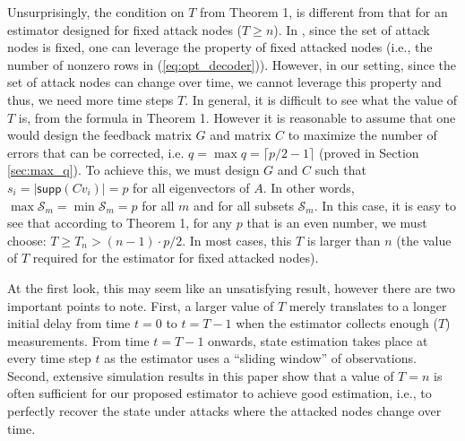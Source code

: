 \documentclass[../../thesis.tex]{subfiles}
\begin{document}
Unsurprisingly, the condition on $T$ from Theorem 1, is different from that for an estimator designed for fixed attack nodes ($T\geq n$). In \cite{Fawzi2014}, since the set of attack nodes is fixed, one can leverage the property of fixed attacked nodes (i.e., the number of nonzero rows in (\ref{eq:opt_decoder})). However, in our setting, since the set of attack nodes can change over time, we cannot leverage this property and thus, we need more time steps $T$.
In general, it is difficult to see what the value of $T$ is, from the formula in Theorem 1. However it is reasonable to assume that one would design the feedback matrix $G$ and matrix $C$ to maximize the number of errors that can be corrected, i.e. $q = \max q = \lceil p/2 - 1 \rceil$ (proved in Section \ref{sec:max_q}). To achieve this, we must design $G$ and $C$ such that $s_i = \lvert \textsf{supp} (C v_i) \rvert = p$ for all eigenvectors of $A$. In other words, $\operatorname{max} \mathcal{S}_m = \operatorname{min} \mathcal{S}_m = p$ for all $m$ and for all subsets $\mathcal{S}_m$. 
In this case, it is easy to see that according to Theorem 1, for any $p$ that is an even number, we must choose: $T\geq T_n > (n-1) \cdot p/2$.
In most cases, this $T$ is larger than $n$ (the value of $T$ required for the estimator for fixed attacked nodes).

At the first look, this may seem like an unsatisfying result, however there are two important points to note. First, a larger value of $T$ merely translates to a longer initial delay from time $t = 0$ to $t=T-1$ when the estimator collects enough ($T$) measurements. From time $t=T-1$ onwards, state estimation takes place at every time step $t$ as the estimator uses a ``sliding window'' of observations. Second, extensive simulation results in this paper show that a value of $T = n$ is often sufficient for our proposed estimator to achieve good estimation, i.e., to perfectly recover the state under attacks where the attacked nodes change over time. 
\end{document}
